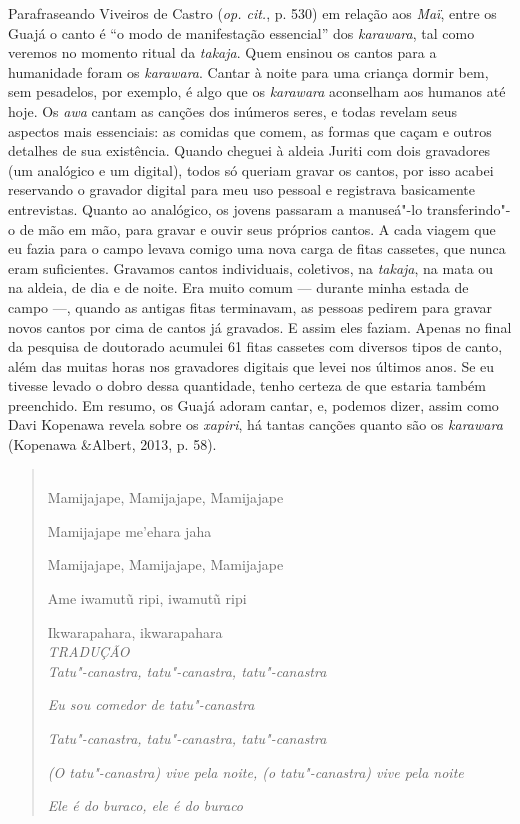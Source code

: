 Parafraseando Viveiros de Castro (\emph{op. cit.}, p. 530) em relação aos
\emph{Maï}, entre os Guajá o canto é ``o modo de manifestação essencial''
dos \emph{karawara}, tal como veremos no momento ritual da
\emph{takaja}. Quem ensinou os cantos para a humanidade foram os
\emph{karawara}. Cantar à noite para uma criança dormir bem, sem
pesadelos, por exemplo, é algo que os \emph{karawara} aconselham aos
humanos até hoje. Os \emph{awa} cantam as canções dos inúmeros seres, e
todas revelam seus aspectos mais essenciais: as comidas que comem, as
formas que caçam e outros detalhes de sua existência. Quando cheguei à
aldeia Juriti com dois gravadores (um analógico e um digital), todos só
queriam gravar os cantos, por isso acabei reservando o gravador digital
para meu uso pessoal e registrava basicamente entrevistas. Quanto ao
analógico, os jovens passaram a manuseá"-lo transferindo"-o de mão em mão,
para gravar e ouvir seus próprios cantos. A cada viagem que eu fazia
para o campo levava comigo uma nova carga de fitas cassetes, que nunca
eram suficientes. Gravamos cantos individuais, coletivos, na
\emph{takaja}, na mata ou na aldeia, de dia e de noite. Era muito comum
--- durante minha estada de campo ---, quando as antigas fitas terminavam,
as pessoas pedirem para gravar novos cantos por cima de cantos já
gravados. E assim eles faziam. Apenas no final da pesquisa de doutorado
acumulei 61 fitas cassetes com diversos tipos de canto, além das muitas
horas nos gravadores digitais que levei nos últimos anos. Se eu tivesse
levado o dobro dessa quantidade, tenho certeza de que estaria também
preenchido. Em resumo, os Guajá adoram cantar, e, podemos dizer, assim
como Davi Kopenawa revela sobre os \emph{xapiri}, há tantas canções
quanto são os \emph{karawara} (Kopenawa \&Albert, 2013, p. 58).

\pagebreak
\begin{quote}
\forceindent
{} \\

Mamijajape, Mamijajape, Mamijajape

Mamijajape me'ehara jaha

Mamijajape, Mamijajape, Mamijajape

Ame iwamutũ ripi, iwamutũ ripi 

Ikwarapahara, ikwarapahara\\

\emph{TRADUÇÃO}\\

\emph{Tatu"-canastra, tatu"-canastra, tatu"-canastra}

\emph{Eu sou comedor de tatu"-canastra}

\emph{Tatu"-canastra, tatu"-canastra, tatu"-canastra}

\emph{(O tatu"-canastra) vive pela noite, (o tatu"-canastra) vive pela noite}

\emph{Ele é do buraco, ele é do buraco}
\end{quote}

